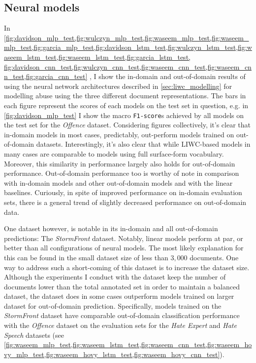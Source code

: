 \subsection{Neural models}

In \cref{fig:davidson_mlp_test,fig:wulczyn_mlp_test,fig:waseem_mlp_test,fig:waseem_mlp_test,fig:garcia_mlp_test,fig:davidson_lstm_test,fig:wulczyn_lstm_test,fig:waseem_lstm_test,fig:waseem_lstm_test,fig:garcia_lstm_test, fig:davidson_cnn_test,fig:wulczyn_cnn_test,fig:waseem_cnn_test,fig:waseem_cnn_test,fig:garcia_cnn_test}
, I show the in-domain and out-of-domain results of using the neural network architectures described in \cref{sec:liwc_modelling} for modelling abuse using the three different document representations. The bars in each figure represent the scores of each models on the test set in question, e.g. in \cref{fig:davidson_mlp_test} I show the macro \texttt{F1-score}s achieved by all models on the test set for the \textit{Offence} dataset.
Considering figures collectively, it's clear that in-domain models in most cases, predictably, out-perform models trained on out-of-domain datasets. Interestingly, it's also clear that while LIWC-based models in many cases are comparable to models using full surface-form vocabulary. Moreover, this similarity in performance largely also holds for out-of-domain performance.
Out-of-domain performance too is worthy of note in comparison with in-domain models and other out-of-domain models and with the linear baselines. Curiously, in spite of improved performance on in-domain evaluation sets, there is a general trend of slightly decreased performance on out-of-domain data.

One dataset however, is notable in its in-domain and all out-of-domain predictions: The \textit{StormFront} dataset. Notably, linear models perform at par, or better than all configurations of neural models. The most likely explanation for this can be found in the small dataset size of less than $3,000$ documents. One way to address such a short-coming of this dataset is to increase the dataset size. Although the experiments I conduct with the dataset keep the number of documents lower than the total annotated set in order to maintain a balanced dataset, the dataset does in some cases outperform models trained on larger dataset for out-of-domain prediction. Specifically, models trained on the \textit{StormFront} dataset have comparable out-of-domain classification performance with the \textit{Offence} dataset on the evaluation sets for the \textit{Hate Expert} and \textit{Hate Speech} datasets (see \cref{fig:waseem_mlp_test,fig:waseem_lstm_test,fig:waseem_cnn_test,fig:waseem_hovy_mlp_test,fig:waseem_hovy_lstm_test,fig:waseem_hovy_cnn_test}).

